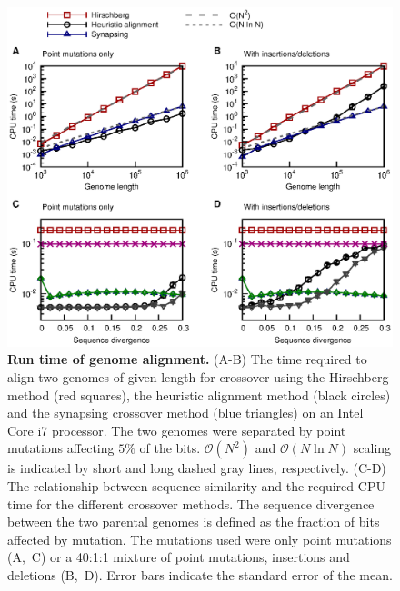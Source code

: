 \documentclass[10pt]{article}
\begin{document}
\begin{figure}[p]
  \centering
  \includegraphics[width=\textwidth]{figures/fig_time.eps}
  \caption{\textbf{Run time of genome alignment.}
    (A-B) The time required to align two genomes of given length for crossover
    using the
    Hirschberg method (red squares), the heuristic alignment method (black circles) and
    the synapsing crossover method (blue triangles) on an Intel Core i7 processor.
    The two genomes were separated by point mutations affecting $5\%$ of the
    bits. $\mathcal{O}(N^2)$ and $\mathcal{O}(N \ln N)$ scaling is indicated
    by short and long dashed gray lines, respectively.
    (C-D) The relationship between sequence similarity and the required CPU
    time for the different crossover methods. The sequence divergence
    between the two parental genomes is defined as the fraction of bits affected
    by mutation. The mutations used were only point mutations (A,~C) or a
    40:1:1 mixture of point mutations, insertions and deletions (B,~D).
    Error bars indicate the standard error of the mean.
  }
  \label{fig:time}
\end{figure}
\end{document}
